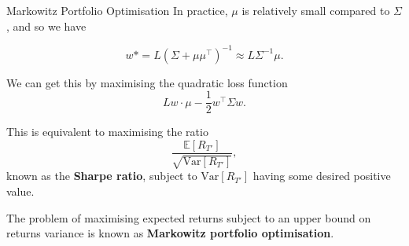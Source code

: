 \documentclass{beamer}
\begin{document}
\begin{frame}{Markowitz Portfolio Optimisation}
	In practice, $\mu$ is relatively small compared to $\Sigma$, and so we have

	$$w* = L(\Sigma+\mu\mu^\top)^{-1}\approx L\Sigma^{-1}\mu.$$

	We can get this by maximising the quadratic loss function
	$$Lw\cdot \mu - \frac{1}{2}w^\top \Sigma w.$$

	This is equivalent to maximising the ratio
	$$\frac{\mathbb{E}[R_{T'}]}{\sqrt{\mathrm{Var}[R_{T'}]}},$$
	known as the \textbf{Sharpe ratio}, subject to $\mathrm{Var}[R_{T'}]$ having some desired positive value. %

	The problem of maximising expected returns subject to an upper bound on returns variance is known as \textbf{Markowitz portfolio optimisation}.%

\end{frame}
\end{document}
